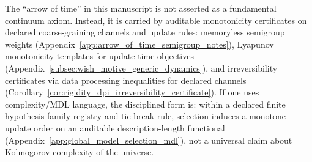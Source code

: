 \AuditTag The ``arrow of time'' in this manuscript is not asserted as a fundamental continuum axiom.
Instead, it is carried by auditable monotonicity certificates on declared coarse-graining channels and update rules:
memoryless semigroup weights (Appendix~\ref{app:arrow_of_time_semigroup_notes}),
Lyapunov monotonicity templates for update-time objectives (Appendix~\ref{subsec:wish_motive_generic_dynamics}),
and irreversibility certificates via data processing inequalities for declared channels (Corollary~\ref{cor:rigidity_dpi_irreversibility_certificate}).
If one uses complexity/MDL language, the disciplined form is: within a declared finite hypothesis family registry and tie-break rule,
selection induces a monotone update order on an auditable description-length functional (Appendix~\ref{app:global_model_selection_mdl}),
not a universal claim about Kolmogorov complexity of the universe.


